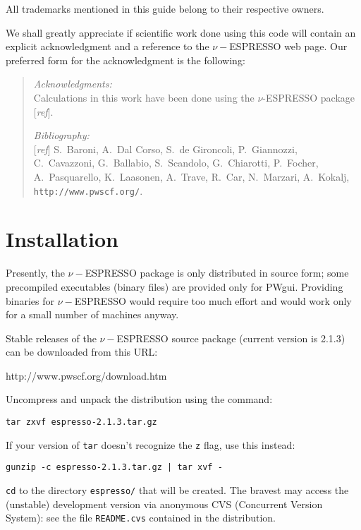 \documentclass[12pt,a4paper]{article}
\def\stableversion{2.1.3} %
\begin{document}
All trademarks mentioned in this guide belong to their respective
owners.

We shall greatly appreciate if scientific work done using this code
will contain an explicit acknowledgment and a reference to the
$\nu-$ESPRESSO web page.
Our preferred form for the acknowledgment is the following:

\begin{quote}
\emph{Acknowledgments:}\\
Calculations in this work have been done using the $\nu$-ESPRESSO package
[\emph{ref}].
\par\noindent
\emph{Bibliography:}\\{}
[\emph{ref}]
S.~Baroni, A.~Dal Corso, S.~de Gironcoli, P.~Giannozzi, %
C.~Cavazzoni, G.~Ballabio, S.~Scandolo, G.~Chiarotti, P.~Focher, %
A.~Pasquarello, K.~Laasonen, A.~Trave, R.~Car, N.~Marzari, %
A.~Kokalj, %
\texttt{http://www.pwscf.org/}.
\end{quote}

\clearpage

\section{Installation}
  \label{installation}

Presently, the $\nu-$ESPRESSO package is only distributed in source
form; some precompiled executables (binary files) are provided only
for PWgui.
Providing binaries for $\nu-$ESPRESSO would require too much effort
and would work only for a small number of machines anyway.

Stable releases of the $\nu-$ESPRESSO source package (current version
is \stableversion) can be downloaded from this URL:
\medskip

%
                  {http://www.pwscf.org/download.htm}
\medskip

\noindent
Uncompress and unpack the distribution using the command:
\medskip

\texttt{tar zxvf espresso-\stableversion.tar.gz}
\medskip

\noindent
If your version of \texttt{tar} doesn't recognize the \texttt{z} flag,
use this instead:
\medskip

\texttt{gunzip -c espresso-\stableversion.tar.gz | tar xvf -}
\medskip

\noindent
\texttt{cd} to the directory \texttt{espresso/} that will be created.
The bravest may access the (unstable) development version via anonymous 
CVS (Concurrent Version System): see the file \texttt{README.cvs}
contained in the distribution.
\end{document}
